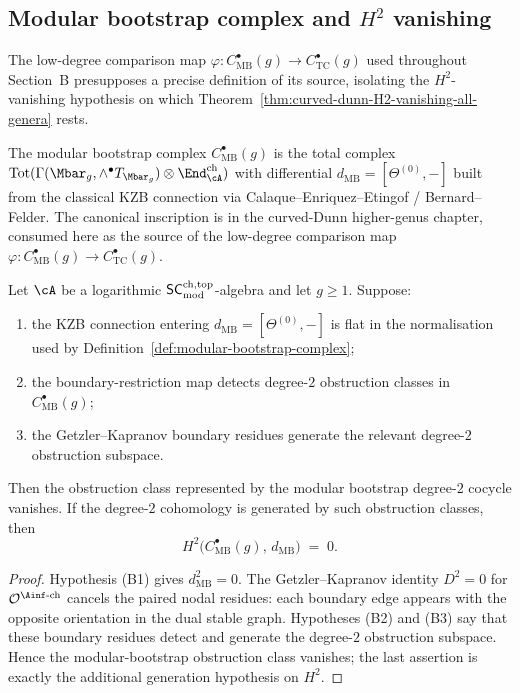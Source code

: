 \subsection{Modular bootstrap complex and $H^2$ vanishing}
\label{subsec:modular-bootstrap-complex}

The low-degree comparison map
$\varphi \colon C^\bullet_{\mathrm{MB}}(g) \to
C^\bullet_{\mathrm{TC}}(g)$ used throughout
Section~B presupposes a precise definition of its source,
isolating the $H^2$-vanishing hypothesis on which
Theorem~\ref{thm:curved-dunn-H2-vanishing-all-genera} rests.

The modular bootstrap complex
$C^\bullet_{\mathrm{MB}}(g)$ is the total complex
$\mathrm{Tot}(\Gamma(\Mbar_g, \wedge^\bullet T_{\Mbar_g})
\otimes \End^{\mathrm{ch}}_{\cA})$ with differential
$d_{\mathrm{MB}} = [\Theta^{(0)}, -]$ built from the classical
KZB connection via Calaque--Enriquez--Etingof / Bernard--Felder.
The canonical inscription is 
in the curved-Dunn higher-genus chapter, consumed here as
the source of the low-degree comparison map
$\varphi \colon C^\bullet_{\mathrm{MB}}(g)
\to C^\bullet_{\mathrm{TC}}(g)$.

\begin{theorem}
\label{thm:mb-H2-vanishing}

Let $\cA$ be a logarithmic $\mathsf{SC}^{\mathrm{ch,top}}_{\mathrm{mod}}$-algebra and let $g\ge1$. Suppose:
\begin{enumerate}[label=\textup{(B\arabic*)}]
\item the KZB connection entering $d_{\mathrm{MB}}=[\Theta^{(0)},-]$
is flat in the normalisation used by
Definition~\ref{def:modular-bootstrap-complex};
\item the boundary-restriction map detects degree-$2$ obstruction
classes in $C^\bullet_{\mathrm{MB}}(g)$;
\item the Getzler--Kapranov boundary residues generate the relevant
degree-$2$ obstruction subspace.
\end{enumerate}
Then the obstruction class represented by the modular bootstrap
degree-$2$ cocycle vanishes. If the degree-$2$ cohomology is generated
by such obstruction classes, then
\[
 H^2\!\bigl(C^\bullet_{\mathrm{MB}}(g),\, d_{\mathrm{MB}}\bigr)
 \;=\; 0.
\]
\end{theorem}

\begin{proof}
Hypothesis \textup{(B1)} gives $d_{\mathrm{MB}}^2=0$. The
Getzler--Kapranov identity $D^2=0$ for
$\mathcal{O}^{\Ainf\text{-ch}}$ cancels the paired nodal residues:
each boundary edge appears with the opposite orientation in the dual
stable graph. Hypotheses \textup{(B2)} and \textup{(B3)} say that these
boundary residues detect and generate the degree-$2$ obstruction
subspace. Hence the modular-bootstrap obstruction class vanishes; the
last assertion is exactly the additional generation hypothesis on
$H^2$.
\end{proof}

